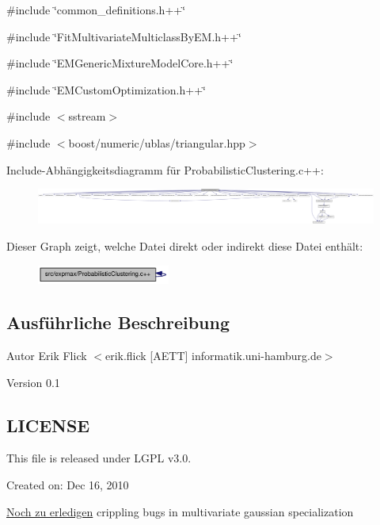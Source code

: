 {\ttfamily \#include \char`\"{}common\_\-definitions.h++\char`\"{}}\par
{\ttfamily \#include \char`\"{}FitMultivariateMulticlassByEM.h++\char`\"{}}\par
{\ttfamily \#include \char`\"{}EMGenericMixtureModelCore.h++\char`\"{}}\par
{\ttfamily \#include \char`\"{}EMCustomOptimization.h++\char`\"{}}\par
{\ttfamily \#include $<$sstream$>$}\par
{\ttfamily \#include $<$boost/numeric/ublas/triangular.hpp$>$}\par
Include-\/Abhängigkeitsdiagramm für ProbabilisticClustering.c++:\nopagebreak
\begin{figure}[H]
\begin{center}
\leavevmode
\includegraphics[width=420pt]{ProbabilisticClustering_8c_09_09__incl}
\end{center}
\end{figure}
Dieser Graph zeigt, welche Datei direkt oder indirekt diese Datei enthält:\nopagebreak
\begin{figure}[H]
\begin{center}
\leavevmode
\includegraphics[width=124pt]{ProbabilisticClustering_8c_09_09__dep__incl}
\end{center}
\end{figure}


\subsection{Ausführliche Beschreibung}
\begin{DoxyAuthor}{Autor}
Erik Flick $<$erik.flick \mbox{[}AETT\mbox{]} informatik.uni-\/hamburg.de$>$ 
\end{DoxyAuthor}
\begin{DoxyVersion}{Version}
0.1
\end{DoxyVersion}
\hypertarget{ProbabilisticClustering_8h_09_09_LICENSE}{}\subsection{LICENSE}\label{ProbabilisticClustering_8h_09_09_LICENSE}
This file is released under LGPL v3.0.

Created on: Dec 16, 2010

\begin{Desc}
\item[\hyperlink{todo__todo000007}{Noch zu erledigen}]crippling bugs in multivariate gaussian specialization\end{Desc}

